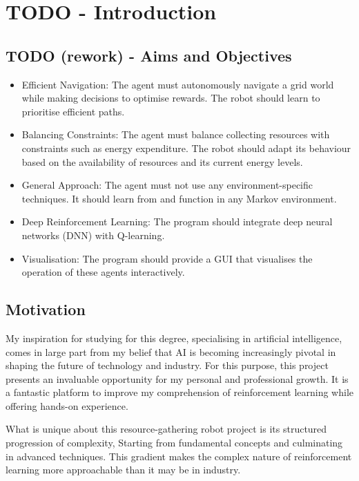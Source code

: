 \documentclass[]{final_report}
\begin{document}

\chapter{TODO - Introduction}




\section{TODO (rework) - Aims and Objectives}
\begin{itemize}
  \item Efficient Navigation: The agent must autonomously navigate a grid world while making decisions to optimise rewards. The robot should learn to prioritise efficient paths.
  \item Balancing Constraints: The agent must balance collecting resources with constraints such as energy expenditure. The robot should adapt its behaviour based on the availability of resources and its current energy levels.
  \item General Approach: The agent must not use any environment-specific techniques. It should learn from and function in any Markov environment.
  \item Deep Reinforcement Learning: The program should integrate deep neural networks (DNN) with Q-learning.
  \item Visualisation: The program should provide a GUI that visualises the operation of these agents interactively.
\end{itemize}

\section{Motivation}

My inspiration for studying for this degree, specialising in artificial intelligence, comes in large part from my belief that AI is becoming increasingly pivotal in shaping the future of technology and industry. For this purpose, this project presents an invaluable opportunity for my personal and professional growth. It is a fantastic platform to improve my comprehension of reinforcement learning while offering hands-on experience. 

What is unique about this resource-gathering robot project is its structured progression of complexity, Starting from fundamental concepts and culminating in advanced techniques. This gradient makes the complex nature of reinforcement learning more approachable than it may be in industry. 
\end{document}
